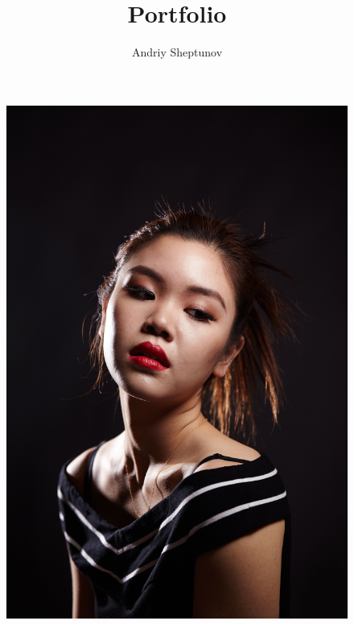 \documentclass{report}
\title{Portfolio}
\author{Andriy Sheptunov}
\date{}
\begin{document}
\maketitle

\begin{figure}
  \centering
  \includegraphics[width=\textwidth]{res/port_allison.jpg}
\end{figure}
\end{document}
